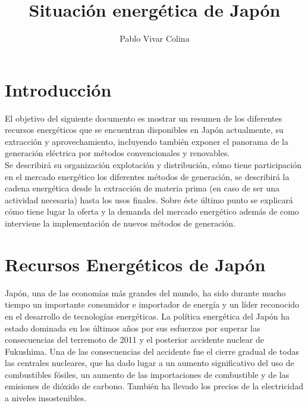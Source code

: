 \documentclass[]{article}
\title{Situación energética de Japón}
\author{Pablo Vivar Colina}
\begin{document}
	
	 

\maketitle


\tableofcontents  %

\listoffigures  %


\section{ Introducción}

El objetivo del siguiente documento es mostrar un resumen de los diferentes recursos energéticos que se encuentran disponibles en Japón actualmente, su extracción y aprovechamiento, incluyendo también exponer el panorama de la generación eléctrica por métodos convencionales y renovables.\\

Se describirá su organización explotación y distribución, cómo tiene participación en el mercado energético los diferentes métodos de generación, se describirá la cadena energética desde la extracción de materia prima (en caso de ser una actividad necesaria) hasta los usos finales. Sobre éste último punto se explicará cómo tiene lugar la oferta y la demanda del mercado energético además de como interviene la implementación de nuevos métodos de generación.\\

\section{Recursos Energéticos de Japón }

Japón, una de las economías más grandes del mundo, ha sido durante mucho tiempo un importante consumidor e importador de energía y un líder reconocido en el desarrollo de tecnologías energéticas. La política energética del Japón ha estado dominada en los últimos años por sus esfuerzos por superar las consecuencias del terremoto de 2011 y el posterior accidente nuclear de Fukushima. Una de las consecuencias del accidente fue el cierre gradual de todas las centrales nucleares, que ha dado lugar a un aumento significativo del uso de combustibles fósiles, un aumento de las importaciones de combustible y de las emisiones de dióxido de carbono. También ha llevado los precios de la electricidad a niveles insostenibles.\\
\end{document}
